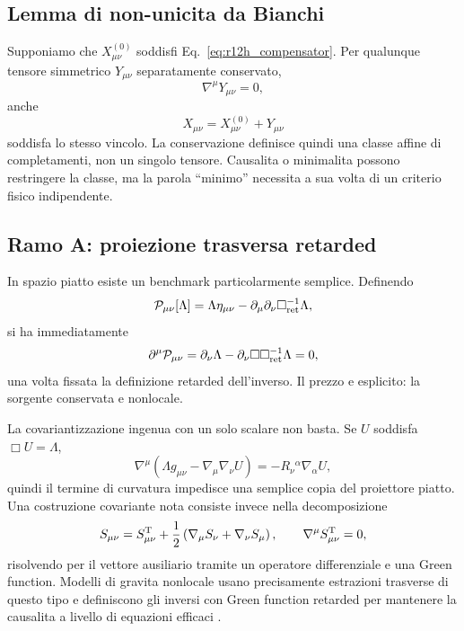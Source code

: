 \documentclass[11pt,a4paper]{article}
\begin{document}
\subsection{Lemma di non-unicita da Bianchi}

Supponiamo che $X^{(0)}_{\mu\nu}$ soddisfi Eq.~\eqref{eq:r12h_compensator}. Per qualunque tensore simmetrico $Y_{\mu\nu}$ separatamente conservato,
\begin{equation}
 \nabla^\mu Y_{\mu\nu}=0,
\end{equation}
anche
\begin{equation}
 X_{\mu\nu}=X^{(0)}_{\mu\nu}+Y_{\mu\nu}
\end{equation}
soddisfa lo stesso vincolo. La conservazione definisce quindi una classe affine di completamenti, non un singolo tensore. Causalita o minimalita possono restringere la classe, ma la parola ``minimo'' necessita a sua volta di un criterio fisico indipendente.

\subsection{Ramo A: proiezione trasversa retarded}

In spazio piatto esiste un benchmark particolarmente semplice. Definendo
\begin{equation}
 \mathcal P_{\mu\nu}[\Lambda]
 =\Lambda\eta_{\mu\nu}
 -\partial_\mu\partial_\nu\Box_{\rm ret}^{-1}\Lambda,
 \label{eq:r12h_flat_projector}
\end{equation}
si ha immediatamente
\begin{equation}
 \partial^\mu\mathcal P_{\mu\nu}
 =\partial_\nu\Lambda-
 \partial_\nu\Box\Box_{\rm ret}^{-1}\Lambda=0,
\end{equation}
una volta fissata la definizione retarded dell'inverso. Il prezzo e esplicito: la sorgente conservata e nonlocale.

La covariantizzazione ingenua con un solo scalare non basta. Se $U$ soddisfa $\Box U=\Lambda$,
\begin{equation}
 \nabla^\mu\left(\Lambda g_{\mu\nu}-\nabla_\mu\nabla_\nu U\right)
 =-R_{\nu}{}^{\alpha}\nabla_\alpha U,
 \label{eq:r12h_curvature_obstruction}
\end{equation}
quindi il termine di curvatura impedisce una semplice copia del proiettore piatto. Una costruzione covariante nota consiste invece nella decomposizione
\begin{equation}
 S_{\mu\nu}=S^{\rm T}_{\mu\nu}
 +\frac12\left(\nabla_\mu S_\nu+\nabla_\nu S_\mu\right),
 \qquad \nabla^\mu S^{\rm T}_{\mu\nu}=0,
 \label{eq:r12h_tensor_transverse}
\end{equation}
risolvendo per il vettore ausiliario tramite un operatore differenziale e una Green function. Modelli di gravita nonlocale usano precisamente estrazioni trasverse di questo tipo e definiscono gli inversi con Green function retarded per mantenere la causalita a livello di equazioni efficaci \cite{KehagiasMaggiore2014,MaggioreMancarella2014}.
\end{document}
